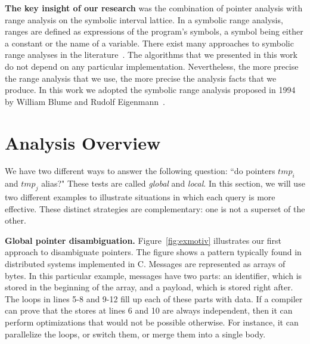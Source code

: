 \documentclass[12pt]{article}
\begin{document}
\textbf{The key insight of our research} was the combination of pointer analysis
with range analysis on the symbolic interval lattice.
In a symbolic range analysis, ranges are defined as expressions of the program's
symbols, a symbol being either a constant or the name of a variable.
There exist many approaches to symbolic range analyses in the
literature~\cite{Blume94,Nazare14,Rugina05}.
The algorithms that we presented in this work do not depend on any particular
implementation.
Nevertheless, the more precise the range analysis that we use, the more
precise the analysis facts that we produce.
In this work we adopted the symbolic range analysis proposed in 1994 by
William Blume and Rudolf Eigenmann~\cite{Blume94}.

\section{Analysis Overview}
\label{sec:ovf}

We have two different ways to answer the
following question: ``do pointers $\mathit{tmp}_i$ and $\mathit{tmp}_j$
alias?"
These tests are called {\em global} and {\em local}.
In this section, we will use two different examples to illustrate situations
in which each query is more effective.
These distinct strategies are complementary: one is not a superset of the other.

\noindent
\textbf{Global pointer disambiguation. }
Figure~\ref{fig:exmotiv} illustrates our first approach to disambiguate
pointers.
The figure shows a pattern typically found in distributed systems
implemented in C.
Messages are represented as arrays of bytes.
In this particular example, messages have two parts: an identifier, which is stored in the beginning of the array, and a payload, which is stored right
after.
The loops in lines 5-8 and 9-12 fill up each of these parts with data.
If a compiler can prove that the stores at lines 6 and 10 are always
independent, then it can perform optimizations that would not be
possible otherwise.
For instance, it can parallelize the loops, or switch them, or merge them into a
single body.
\end{document}
